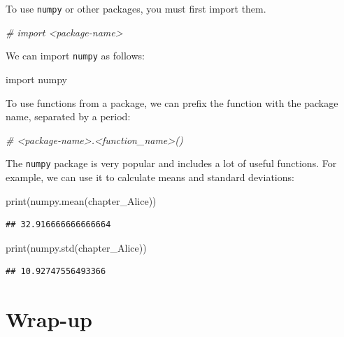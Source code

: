 \documentclass[
]{book}
\newenvironment{Shaded}{\begin{snugshade}}{\end{snugshade}}
\newcommand{\BuiltInTok}[1]{#1}
\newcommand{\CommentTok}[1]{\textcolor[rgb]{0.56,0.35,0.01}{\textit{#1}}}
\newcommand{\ImportTok}[1]{#1}
\newcommand{\NormalTok}[1]{#1}
\begin{document}
To use \texttt{numpy} or other packages, you must first import them.

\begin{Shaded}
\begin{Highlighting}[]
\CommentTok{\# import \textless{}package{-}name\textgreater{}}
\end{Highlighting}
\end{Shaded}

We can import \texttt{numpy} as follows:

\begin{Shaded}
\begin{Highlighting}[]
\ImportTok{import}\NormalTok{ numpy}
\end{Highlighting}
\end{Shaded}

To use functions from a package, we can prefix the function with the package name, separated by a period:

\begin{Shaded}
\begin{Highlighting}[]
\CommentTok{\# \textless{}package{-}name\textgreater{}.\textless{}function\_name\textgreater{}()}
\end{Highlighting}
\end{Shaded}

The \texttt{numpy} package is very popular and includes a lot of useful functions. For example, we can use it to calculate means and standard deviations:

\begin{Shaded}
\begin{Highlighting}[]
\BuiltInTok{print}\NormalTok{(numpy.mean(chapter\_Alice))}
\end{Highlighting}
\end{Shaded}

\begin{verbatim}
## 32.916666666666664
\end{verbatim}

\begin{Shaded}
\begin{Highlighting}[]
\BuiltInTok{print}\NormalTok{(numpy.std(chapter\_Alice))}
\end{Highlighting}
\end{Shaded}

\begin{verbatim}
## 10.92747556493366
\end{verbatim}

\hypertarget{wrap-up-5}{%
\section{Wrap-up}\label{wrap-up-5}}
\end{document}
